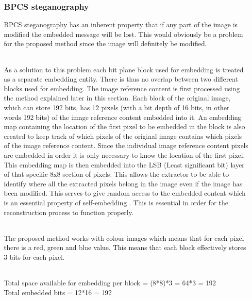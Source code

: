 \documentclass[12pt]{article}
\begin{document}
\subsubsection{BPCS steganography} 
\label{bpcsSteg}

BPCS steganography has an inherent property that if any part of the image is modified the embedded message will be lost.
This would obviously be a problem for the proposed method since the image will definitely be modified.

\hspace{0pt} \\
As a solution to this problem each bit plane block used for embedding is treated as a separate embedding entity.
There is thus no overlap between two different blocks used for embedding.
The image reference content is first processed using the method explained later in this section.
Each block of the original image, which can store 192 bits, has 12 pixels (with a bit depth of 16 bits, in other words 192 bits) of the image reference content embedded into it.
An embedding map containing the location of the first pixel to be embedded in the block is also created to keep track of which pixels of the original image contains which pixels of the image reference content.
Since the individual image reference content pixels are embedded in order it is only necessary to know the location of the first pixel.
This embedding map is then embedded into the LSB (Least significant bit) layer of that specific 8x8 section of pixels. 
This allows the extractor to be able to identify where all the extracted pixels belong in the image even if the image has been modified.
This serves to give random access to the embedded content which is an essential property of self-embedding \cite{korus2013efficient}.
This is essential in order for the reconstruction process to function properly.

\hspace{0pt} \\
The proposed method works with colour images which means that for each pixel there is a red, green and blue value. This means that each block effectively stores 3 bits for each pixel.

\hspace{0pt} \\
Total space available for embedding per block = (8*8)*3 = 64*3 = 192
\hspace{0pt} \\
Total embedded bits = 12*16 = 192
\end{document}
